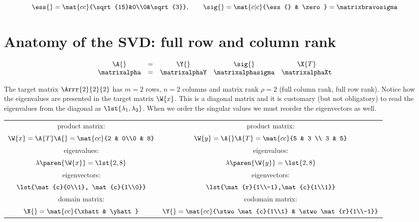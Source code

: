 \documentclass[10pt]{newsiambook}
\begin{document}
\begin{equation*}
  \ess{} = \mat{cc}{\sqrt{15}&0\\0&\sqrt{3}}, \qquad \sig{}= \mat{c|c}{\ess{} & \zero} = \matrixbravosigma
\end{equation*}

\section*{Anatomy of the SVD: full row and column rank}

\begin{equation*}
  \begin{array}{ccccc}
    \A{} &=& \Y{} & \sig{} & \X{T} \\
    \matrixalpha & = & \matrixalphaY & \matrixalphasigma & \matrixalphaXt
  \end{array}
\end{equation*}

The target matrix $\Arrr{2}{2}{2}$ has $m=2$ rows, $n=2$ columns and matrix rank $\rho = 2$ (full column rank, full row rank). Notice how the eigenvalues are presented in the target matrix $\W{x}$. This is a diagonal matrix and it is customary (but not obligatory) to read the eigenvalues from the diagonal as $\lst{\lambda_{1}, \lambda_{2}}$. When we order the singular values we must reorder the eigenvectors as well.

\begin{table}[htdp]
\begin{center}
\begin{tabular}{c|c}
product matrix: & product matrix: \\
$\W{x} = \A{T}\A{} = \mat{cc}{2 & 0\\0 & 8}$ &
$\W{y} = \A{}\A{T} = \mat{cc}{5 & 3 \\ 3 & 5}$ \\[30pt]
eigenvalues: & eigenvalues: \\
$\lambda\paren{\W{x}} = \lst{2,8}$ &
$\lambda\paren{\W{y}} = \lst{2,8}$ \\[20pt]
eigenvectors: & eigenvectors: \\
$\lst{\mat{c}{0\\1}, \mat{c}{1\\0}}$ &
$\lst{\mat{r}{1\\-1},\mat{c}{1\\1}}$ \\[30pt]
domain matrix: & codomain matrix: \\
$\X{} = \mat{cc}{\xhatt & \yhatt}$ &
$\Y{} = \mat{cc}{\stwo\mat{c}{1\\1} & \stwo\mat{r}{1\\-1}}$\\[25pt]
\end{tabular}
\end{center}
\label{default}
\end{table}%
\end{document}
